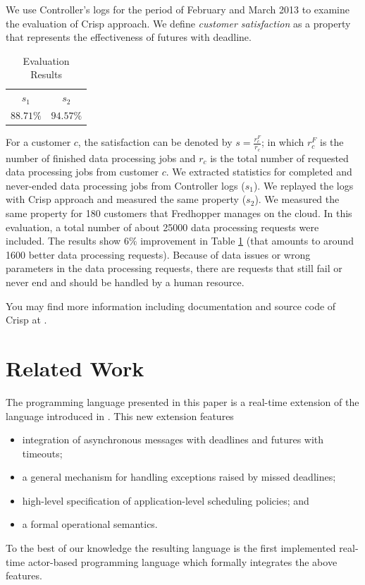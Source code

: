 We use Controller's logs for the period of February and March 2013 to examine the evaluation of Crisp approach.
We define \emph{customer satisfaction} as a property that represents the effectiveness of futures with deadline.
\begin{table}
\vspace{-15pt}
\begin{tabular}{c c}\thickhline
$s_1$ & $s_2$ \\ \thickhline
$88.71\%$ & $94.57\%$ \\ \hline
\end{tabular}
\caption{Evaluation Results}
\label{tbl:eval}
\vspace{-15pt}
\end{table}
For a customer $c$, the satisfaction can be denoted by $s = \frac{r^F_c}{r_c}$; in which $r^F_c$ is the number of finished data processing jobs and $r_c$ is the total number of requested data processing jobs from customer $c$. 
We extracted statistics for completed and never-ended data processing jobs from Controller logs ($s_1$).
We replayed the logs with Crisp approach and measured the same property ($s_2$).
We measured the same property for 180 customers that Fredhopper manages on the cloud.
In this evaluation, a total number of about 25000 data processing requests were included.
The results show $6\%$ improvement in Table \ref{tbl:eval} (that amounts to around 1600 better data processing requests). 
Because of data issues or wrong parameters in the data processing requests, there are requests that still fail or never end and should be handled by a human resource.

You may find more information including documentation and source code of Crisp at .

\section{Related Work} \label{sec:relwork}
The programming language presented in this paper is a real-time  extension of the  language introduced in  \cite{crisp-sac}. This new extension features
\begin{itemize}
 \item integration of  asynchronous messages with  deadlines and futures with timeouts;
 \item  a general mechanism for handling exceptions raised by missed deadlines;
  \item high-level specification of application-level scheduling policies; and
  \item a formal operational semantics.
\end{itemize}
To the best of our knowledge the resulting language is the first implemented 
real-time actor-based programming language which formally integrates the above features.

